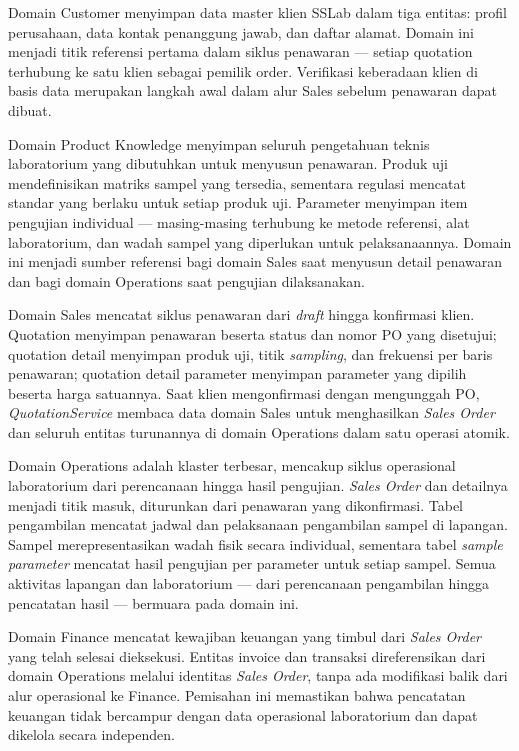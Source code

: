Domain Customer menyimpan data master klien SSLab dalam tiga entitas: profil perusahaan, data kontak penanggung jawab, dan daftar alamat. Domain ini menjadi titik referensi pertama dalam siklus penawaran — setiap quotation terhubung ke satu klien sebagai pemilik order. Verifikasi keberadaan klien di basis data merupakan langkah awal dalam alur Sales sebelum penawaran dapat dibuat.

Domain Product Knowledge menyimpan seluruh pengetahuan teknis laboratorium yang dibutuhkan untuk menyusun penawaran. Produk uji mendefinisikan matriks sampel yang tersedia, sementara regulasi mencatat standar yang berlaku untuk setiap produk uji. Parameter menyimpan item pengujian individual — masing-masing terhubung ke metode referensi, alat laboratorium, dan wadah sampel yang diperlukan untuk pelaksanaannya. Domain ini menjadi sumber referensi bagi domain Sales saat menyusun detail penawaran dan bagi domain Operations saat pengujian dilaksanakan.

Domain Sales mencatat siklus penawaran dari \textit{draft} hingga konfirmasi klien. Quotation menyimpan penawaran beserta status dan nomor PO yang disetujui; quotation detail menyimpan produk uji, titik \textit{sampling}, dan frekuensi per baris penawaran; quotation detail parameter menyimpan parameter yang dipilih beserta harga satuannya. Saat klien mengonfirmasi dengan mengunggah PO, \textit{QuotationService} membaca data domain Sales untuk menghasilkan \textit{Sales Order} dan seluruh entitas turunannya di domain Operations dalam satu operasi atomik.

Domain Operations adalah klaster terbesar, mencakup siklus operasional laboratorium dari perencanaan hingga hasil pengujian. \textit{Sales Order} dan detailnya menjadi titik masuk, diturunkan dari penawaran yang dikonfirmasi. Tabel pengambilan mencatat jadwal dan pelaksanaan pengambilan sampel di lapangan. Sampel merepresentasikan wadah fisik secara individual, sementara tabel \textit{sample parameter} mencatat hasil pengujian per parameter untuk setiap sampel. Semua aktivitas lapangan dan laboratorium — dari perencanaan pengambilan hingga pencatatan hasil — bermuara pada domain ini.

Domain Finance mencatat kewajiban keuangan yang timbul dari \textit{Sales Order} yang telah selesai dieksekusi. Entitas invoice dan transaksi direferensikan dari domain Operations melalui identitas \textit{Sales Order}, tanpa ada modifikasi balik dari alur operasional ke Finance. Pemisahan ini memastikan bahwa pencatatan keuangan tidak bercampur dengan data operasional laboratorium dan dapat dikelola secara independen.


